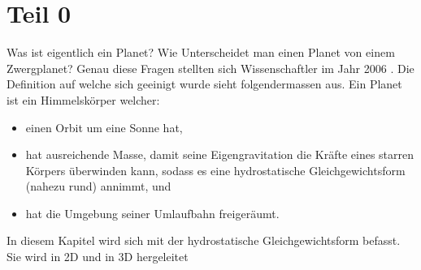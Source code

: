 %
%
%
%
\section{Teil 0\label{planet:section:teil0}}
Was ist eigentlich ein Planet?
Wie Unterscheidet man einen Planet von einem Zwergplanet?
Genau diese Fragen stellten sich Wissenschaftler im Jahr 2006 \cite{planet:iaub5}.
Die Definition auf welche sich geeinigt wurde sieht folgendermassen aus.
Ein Planet ist ein Himmelskörper welcher:
\begin{itemize}
	\item einen Orbit um eine Sonne hat,
	\item hat ausreichende Masse, damit seine Eigengravitation die Kräfte eines starren Körpers überwinden kann, sodass es eine hydrostatische Gleichgewichtsform (nahezu rund) annimmt, und
	\item hat die Umgebung seiner Umlaufbahn freigeräumt.
\end{itemize}

In diesem Kapitel wird sich mit der hydrostatische Gleichgewichtsform befasst.
Sie wird in 2D und in 3D hergeleitet


